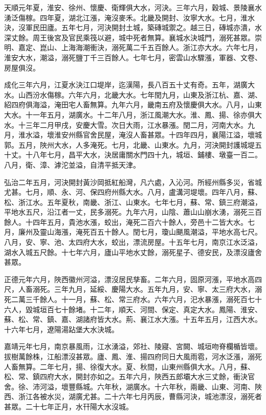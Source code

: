 \begin{pinyinscope}
天順元年夏，淮安、徐州、懷慶、衛輝俱大水，河決。三年六月，穀城、景陵襄水湧泛傷稼。四年夏，湖北江漲，淹沒麥禾。北畿及開封、汝寧大水。七月，淮水決，沒軍民田廬。五年七月，河決開封土城，築磚城禦之。越三日，磚城亦潰，水深丈餘。周王後宮及官民乘筏以避，城中死者無算。襄城水決城門，溺死甚眾。崇明、嘉定、崑山、上海海潮衝決，溺死萬二千五百餘人。浙江亦大水。六年七月，淮安大水，潮溢，溺死鹽丁千三百餘人。七年七月，密雲山水驟漲，軍器、文卷、房屋俱沒。

成化三年六月，江夏水決江口堤岸，迄漢陽，長八百五十丈有奇。五年，湖廣大水。山西汾水傷稼。六年六月，北畿大水。七年閏九月，山東及浙江杭、嘉、湖、紹四府俱海溢，淹田宅人畜無算。九年六月，畿南五府及懷慶俱大水。八月，山東大水。十一年五月，湖廣水。十二年八月，浙江風潮大水。淮、鳳、揚、徐亦俱大水。十三年二月甲戌，安慶大雪。次日大雨，江水暴漲。閏二月，河南大水。九月，淮水溢，壞淮安州縣官舍民屋，淹沒人畜甚眾。十四年四月，襄陽江溢，壞城郭。五月，陜州大水，人多淹死。七月，北畿、山東水。九月，河決開封護城堤五十丈。十八年七月，昌平大水，決居庸關水門四十九，城垣、鋪樓、墩臺一百二。八月，衛、漳、滹沱並溢，自清平抵天津。

弘治二年五月，河決開封黃沙岡抵紅船灣，凡六處，入沁河。所經州縣多災，省城尤甚。七月，順、永、河、保四府州縣大水。八月，盧溝河堤壞。四年八月，蘇、松、浙江水。五年夏秋，南畿、浙江、山東水。七年七月，蘇、常、鎮三府潮溢，平地水五尺，沿江者一丈，民多溺死。九年六月，山陰、蕭山山崩水湧，溺死三百餘人。十四年五月，貴池水漲，蛟出，淹死二百六十餘人，旁邑十二皆大水。七月，廉州及靈山海漲，淹死百五十餘人。閏七月，瓊山颶風潮溢，平地水高七尺。八月，安、寧、池、太四府大水，蛟出，漂流房屋。十五年七月，南京江水泛溢，湖水入城五尺餘。十七年六月，廬山平地水丈餘，溺死星子、德安民，及漂沒廬舍甚眾。

正德元年六月，陜西徽州河溢，漂沒居民孳畜。二年六月，固原河漲，平地水高四尺，人畜溺死。三年九月，延綏、慶陽大水。五年九月，安、寧、太三府大水，溺死二萬三千餘人。十一月，蘇、松、常三府水。六年六月，汜水暴漲，溺死百七十六人，毀城垣百七十餘堵。十二年，順天、河間、保定、真定大水。鳳陽、淮安、蘇、松、常、鎮、嘉、湖諸府皆大水。荊、襄江水大漲。十五年五月，江西大水。十六年七月，遼陽湯跕堡大水決城。

嘉靖元年七月，南京暴風雨，江水湧溢，郊社、陵寢、宮闕、城垣吻脊欄楯皆壞。拔樹萬餘株，江船漂沒甚眾。廬、鳳、淮、揚四府同日大風雨雹，河水泛漲，溺死人畜無算。二年七月，揚、徐復大水。夏、秋間，山東州縣俱大水。八月，蘇、松、常、鎮四府大水，開封亦如之。五年六月，陜西五郎壩大水三丈餘，衝決官舍。徐、沛河溢，壞豐縣城。六年秋，湖廣水。十六年秋，兩畿、山東、河南、陜西、浙江各被水災，湖廣尤甚。二十六年七月丙辰，曹縣河決，城池漂沒，溺死者甚眾。二十七年正月，水幵陽大水沒城。


\end{pinyinscope}
